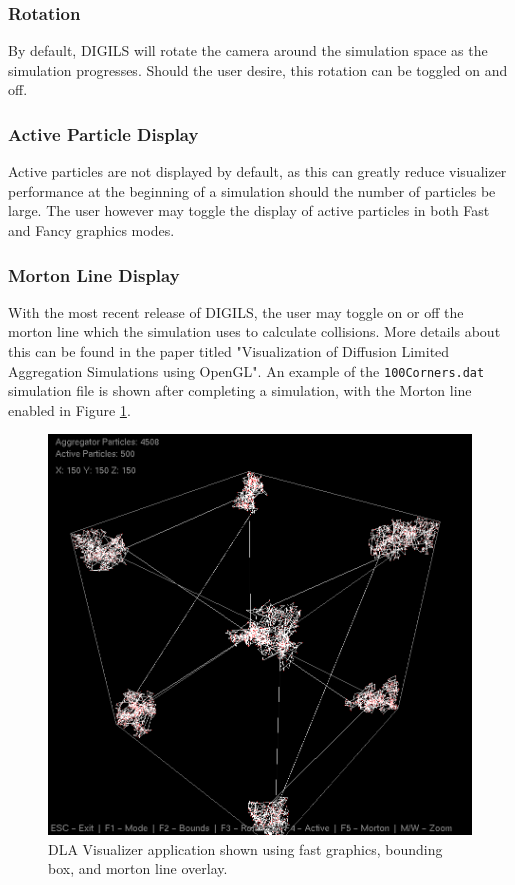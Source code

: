 \documentclass[fleqn,10pt]{UserGuideArx} %
\begin{document}
\subsubsection{Rotation}
By default, DIGILS will rotate the camera around the simulation space as the simulation progresses. Should the user desire, this rotation can be toggled on and off.\\

\subsubsection{Active Particle Display}
Active particles are not displayed by default, as this can greatly reduce visualizer performance at the beginning of a simulation should the number of particles be large. The user however may toggle the display of active particles in both Fast and Fancy graphics modes.\\

\subsubsection{Morton Line Display}
With the most recent release of DIGILS, the user may toggle on or off the morton line which the simulation uses to calculate collisions. More details about this can be found in the paper titled "Visualization of Diffusion Limited Aggregation Simulations using OpenGL". An example of the \texttt{100Corners.dat} simulation file is shown after completing a simulation, with the Morton line enabled in Figure \ref{fig:CornersMorton}.
\begin{figure}[!ht]\centering %
    \includegraphics[width=\linewidth]{images/CornersMorton.png}
    \caption{DLA Visualizer application shown using fast graphics, bounding box, and morton line overlay.}
    \label{fig:CornersMorton}
    \end{figure}
~\\
\end{document}
